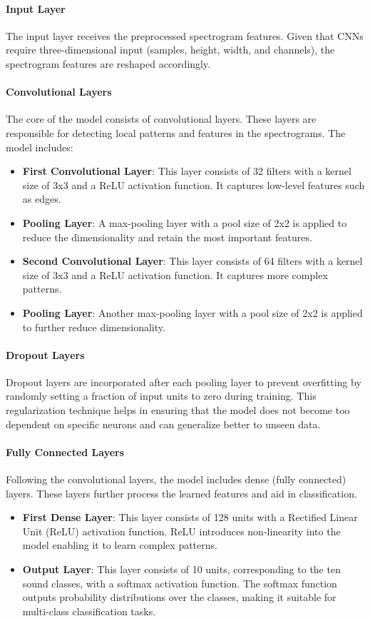 \documentclass[conference]{IEEEtran}
\begin{document}
\paragraph{Input Layer}
The input layer receives the preprocessed spectrogram features. Given that CNNs require three-dimensional input (samples, height, width, and channels), the spectrogram features are reshaped accordingly.

\paragraph{Convolutional Layers}
The core of the model consists of convolutional layers. These layers are responsible for detecting local patterns and features in the spectrograms. The model includes:
\begin{itemize}
    \item \textbf{First Convolutional Layer}: This layer consists of 32 filters with a kernel size of 3x3 and a ReLU activation function. It captures low-level features such as edges.
    \item \textbf{Pooling Layer}: A max-pooling layer with a pool size of 2x2 is applied to reduce the dimensionality and retain the most important features.
    \item \textbf{Second Convolutional Layer}: This layer consists of 64 filters with a kernel size of 3x3 and a ReLU activation function. It captures more complex patterns.
    \item \textbf{Pooling Layer}: Another max-pooling layer with a pool size of 2x2 is applied to further reduce dimensionality.
\end{itemize}

\paragraph{Dropout Layers}
Dropout layers are incorporated after each pooling layer to prevent overfitting by randomly setting a fraction of input units to zero during training. This regularization technique helps in ensuring that the model does not become too dependent on specific neurons and can generalize better to unseen data.

\paragraph{Fully Connected Layers}
Following the convolutional layers, the model includes dense (fully connected) layers. These layers further process the learned features and aid in classification.
\begin{itemize}
    \item \textbf{First Dense Layer}: This layer consists of 128 units with a Rectified Linear Unit (ReLU) activation function. ReLU introduces non-linearity into the model enabling it to learn complex patterns.
    \item \textbf{Output Layer}: This layer consists of 10 units, corresponding to the ten sound classes, with a softmax activation function. The softmax function outputs probability distributions over the classes, making it suitable for multi-class classification tasks.
\end{itemize}
\end{document}
